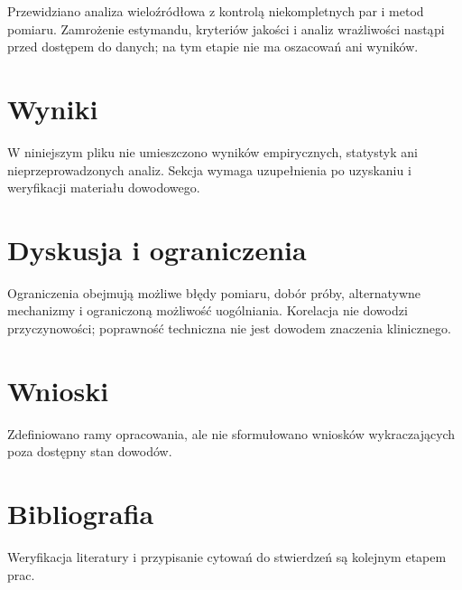 \documentclass[11pt,a4paper]{article}
\begin{document}
Przewidziano analiza wieloźródłowa z kontrolą niekompletnych par i metod pomiaru. Zamrożenie estymandu, kryteriów jakości i analiz wrażliwości nastąpi przed dostępem do danych; na tym etapie nie ma oszacowań ani wyników.

\section{Wyniki}

W niniejszym pliku nie umieszczono wyników empirycznych, statystyk ani nieprzeprowadzonych analiz. Sekcja wymaga uzupełnienia po uzyskaniu i weryfikacji materiału dowodowego.

\section{Dyskusja i ograniczenia}

Ograniczenia obejmują możliwe błędy pomiaru, dobór próby, alternatywne mechanizmy i ograniczoną możliwość uogólniania. Korelacja nie dowodzi przyczynowości; poprawność techniczna nie jest dowodem znaczenia klinicznego.

\section{Wnioski}

Zdefiniowano ramy opracowania, ale nie sformułowano wniosków wykraczających poza dostępny stan dowodów.

\section*{Bibliografia}

Weryfikacja literatury i przypisanie cytowań do stwierdzeń są kolejnym etapem prac.
\end{document}
